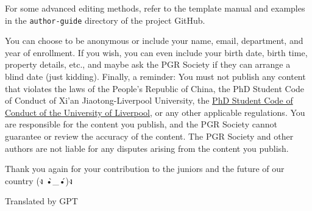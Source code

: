 \vspace{5mm}
For some advanced editing methods, refer to the template manual and examples in the \texttt{author-guide} directory of the project GitHub.

\vspace{5mm}
You can choose to be anonymous or include your name, email, department, and year of enrollment. If you wish, you can even include your birth date, birth time, property details, etc., and maybe ask the PGR Society if they can arrange a blind date (just kidding). Finally, a reminder: You must not publish any content that violates the laws of the People's Republic of China, the PhD Student Code of Conduct of Xi'an Jiaotong-Liverpool University, the \href{https://www.liverpool.ac.uk/aqsd/academic-codes-of-practice/pgr-code-of-practice/}{PhD Student Code of Conduct of the University of Liverpool}, or any other applicable regulations. You are responsible for the content you publish, and the PGR Society cannot guarantee or review the accuracy of the content. The PGR Society and other authors are not liable for any disputes arising from the content you publish.

\vspace{5mm}
Thank you again for your contribution to the juniors and the future of our country (ง •̀\_•́)ง

\begin{flushright}
    Translated by GPT
\end{flushright}